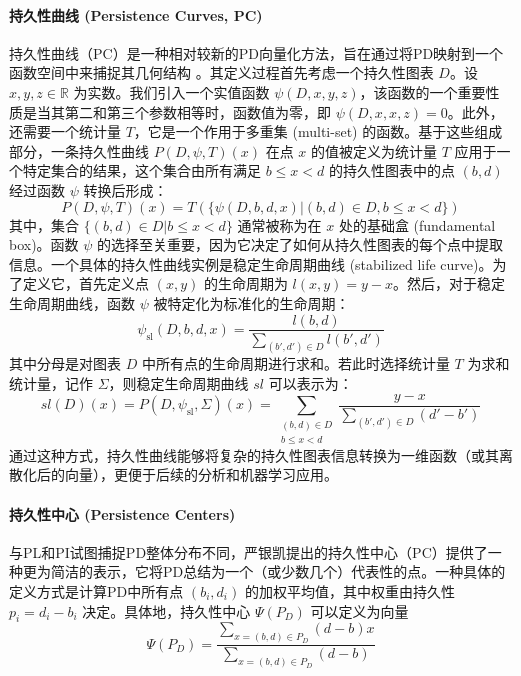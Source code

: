 \paragraph{持久性曲线 (Persistence Curves, PC)}
\label{sec:feat_pc}
持久性曲线（PC）\cite{chung2020persistent}是一种相对较新的PD向量化方法，旨在通过将PD映射到一个函数空间中来捕捉其几何结构 。其定义过程首先考虑一个持久性图表 $D$。设 $x, y, z \in \mathbb{R}$ 为实数。我们引入一个实值函数 $\psi(D, x, y, z)$，该函数的一个重要性质是当其第二和第三个参数相等时，函数值为零，即 $\psi(D, x, x, z) = 0$。此外，还需要一个统计量 $T$，它是一个作用于多重集 (multi-set) 的函数。基于这些组成部分，一条持久性曲线 $P(D, \psi, T)(x)$ 在点 $x$ 的值被定义为统计量 $T$ 应用于一个特定集合的结果，这个集合由所有满足 $b \le x < d$ 的持久性图表中的点 $(b,d)$ 经过函数 $\psi$ 转换后形成：
\begin{equation}
    P(D, \psi, T)(x) = T \left( \{ \psi(D, b, d, x) | (b,d) \in D, b \le x < d \} \right)
\end{equation}
其中，集合 $\{ (b,d) \in D | b \le x < d \}$ 通常被称为在 $x$ 处的基础盒 (fundamental box)。函数 $\psi$ 的选择至关重要，因为它决定了如何从持久性图表的每个点中提取信息。一个具体的持久性曲线实例是稳定生命周期曲线 (stabilized life curve)。为了定义它，首先定义点 $(x,y)$ 的生命周期为 $l(x,y) = y-x$。然后，对于稳定生命周期曲线，函数 $\psi$ 被特定化为标准化的生命周期：
\begin{equation}
    \psi_{\text{sl}}(D, b, d, x) = \frac{l(b,d)}{\sum_{(b',d') \in D} l(b',d')}
\end{equation}
其中分母是对图表 $D$ 中所有点的生命周期进行求和。若此时选择统计量 $T$ 为求和统计量，记作 $\Sigma$，则稳定生命周期曲线 $sl$ 可以表示为：
\begin{equation}
    sl(D)(x) = P(D, \psi_{\text{sl}}, \Sigma)(x) = \sum_{\substack{(b,d) \in D \\ b \le x < d}} \frac{y-x}{\sum_{(b',d') \in D} (d'-b')}
\end{equation}
通过这种方式，持久性曲线能够将复杂的持久性图表信息转换为一维函数（或其离散化后的向量），更便于后续的分析和机器学习应用。

\paragraph{持久性中心 (Persistence Centers)}
\label{sec:feat_pcen}
与PL和PI试图捕捉PD整体分布不同，严银凯提出的持久性中心（PC）提供了一种更为简洁的表示，它将PD总结为一个（或少数几个）代表性的点。一种具体的定义方式是计算PD中所有点 $(b_i, d_i)$ 的加权平均值，其中权重由持久性 $p_i = d_i - b_i$ 决定。具体地，持久性中心 $\Psi(P_D)$ 可以定义为向量
\begin{equation}
    \Psi(P_D) = \frac{\sum_{x=(b,d) \in P_D} (d-b) x}{\sum_{x=(b,d) \in P_D} (d-b)}
\end{equation}

